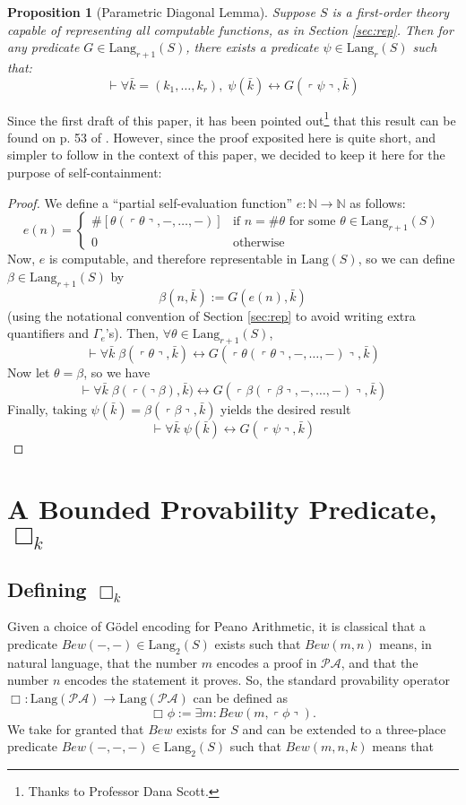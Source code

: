 \documentclass[onecolumn]{miri-tech-article}
\newtheorem{proposition}[theorem]{Proposition}
\numberwithin{equation}{section}
\theoremstyle{definition}
\newcommand{\NN}{\mathbb{N}}
\newcommand{\proves}[1]{\underset{#1}{\vdash}}
\newcommand{\bx}[1]{\Box_{#1}}
\newcommand{\PA}{\mathcal{P}\!\mathcal{A}}
\newcommand{\Lang}{\mathrm{Lang}}
\renewcommand{\to}{\rightarrow}
\renewcommand{\iff}{\leftrightarrow}
\newcommand{\qquote}[1]{\left\ulcorner #1 \right\urcorner}
\renewcommand{\-}{^{-1}}
\begin{document}
\begin{proposition}[Parametric Diagonal Lemma]Suppose $S$ is a first-order theory capable of representing all computable functions, as in Section \ref{sec:rep}.  Then for any predicate $G\in\Lang_{r+1}(S)$, there exists a predicate $\psi\in\Lang_r(S)$ such that: \\
$$\proves{} \forall \bar k = (k_1,\ldots,k_r), \; \psi(\bar k) \iff G(\qquote\psi,\bar k)$$
\end{proposition}

Since the first draft of this paper, it has been pointed out\footnote{Thanks to Professor Dana Scott.} that this result can be found on p. 53 of \cite{Boolos:1993:Logic}.  However, since the proof exposited here is quite short, and simpler to follow in the context of this paper, we decided to keep it here for the purpose of self-containment:

\begin{proof}
We define a ``partial self-evaluation function'' $e:\NN\to\NN$ as follows: 
$$e(n) = \begin{cases} 
\#\left[\theta(\qquote\theta,-,\ldots,-)\right] &\mbox{if } n = \#\theta \text{ for some }\theta\in\Lang_{r+1}(S) \\ 
0 & \mbox{otherwise }
\end{cases}
$$
Now, $e$ is computable, and therefore representable in $\Lang(S)$, so we can define $\beta\in\Lang_{r+1}(S)$ by 
$$\beta(n,\bar k) := G(e(n),\bar k)$$ 
(using the notational convention of Section \ref{sec:rep} to avoid writing extra quantifiers and $\Gamma_e$'s).  Then, $\forall \theta\in\Lang_{r+1}(S)$,
$$\proves{} \forall \bar k\; \beta(\qquote{\theta},\bar k) \iff G(\qquote{\theta(\qquote{\theta},-,\ldots,-)},\bar k)$$
Now let $\theta = \beta$, so we have
$$\proves{} \forall \bar k\; \beta(\qquote(\beta),\bar k) \iff G(\qquote{\beta(\qquote{\beta},-,\ldots,-)},\bar k)$$
%
Finally, taking $\psi(\bar k) = \beta(\qquote{\beta},\bar k)$ yields the desired result
$$\proves{} \forall \bar k\; \psi(\bar k) \iff G(\qquote{\psi},\bar k)$$


\end{proof}

\section{A Bounded Provability Predicate, \texorpdfstring{$\bx{k}$}{box k}}
\subsection{Defining \texorpdfstring{$\bx{k}$}{box k}}
Given a choice of G\"{o}del encoding for Peano Arithmetic, it is classical that a predicate $Bew(-,-) \in \Lang_2(S)$ exists such that $Bew(m,n)$ means, in natural language, that the number $m$ encodes a proof in $\PA$, and that the number $n$ encodes the statement it proves.  So, the standard provability operator $\bx{}:\Lang(\PA)\to\Lang(\PA)$ can be defined as
$$\bx{}\phi := \exists m : Bew(m,\qquote\phi).$$
We take for granted that $Bew$ exists for $S$ and can be extended to a three-place predicate $Bew(-,-,-) \in \Lang_2(S)$ such that $Bew(m,n,k)$ means that 
\end{document}

